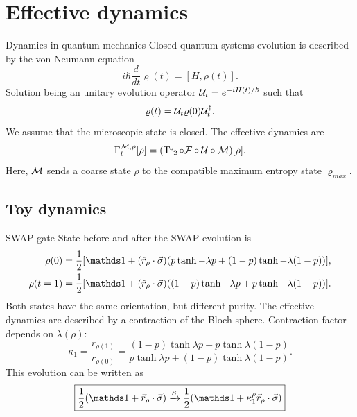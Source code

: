 \section{Effective dynamics}
\begin{frame}{Dynamics in quantum mechanics}
    Closed quantum systems evolution is described by the von Neumann equation
    \begin{equation*}
        i\hbar\frac{d}{d t} \varrho(t)=[H,\rho(t)].
    \end{equation*}
    Solution being an unitary evolution operator $\mathcal{U}_{t}=e^{-iH(t)/\hbar}$ such that
    \begin{equation*}
        \varrho(t)=\mathcal{U}_{t}\varrho(0)\mathcal{U}_{t}^{\dag}.
    \end{equation*}
    We assume that the microscopic state is closed. The effective dynamics are
    \begin{equation*}
        \Gamma_{t}^{\mathcal{M},\rho}[\rho]=(\Tr_{2}\circ\mathcal{F}\circ\mathcal{U}\circ\mathcal{M})[\rho].
    \end{equation*}
        Here, $\mathcal{M}$ sends a coarse state $\rho$ to the compatible maximum entropy state $\varrho_{max}$.
\end{frame}

\subsection{Toy dynamics}

\begin{frame}{SWAP gate}
    State before and after the SWAP evolution is
    \begin{align*}
        \rho(0)&=\frac{1}{2}[\Id+(\hat{r}_{\rho}\cdot\vec{\sigma})(p\tanh{-\lambda p}+(1-p)\tanh{-\lambda (1-p)})],\\
        \rho(t=1)&=\frac{1}{2}[\Id+(\hat{r}_{\rho}\cdot\vec{\sigma})((1-p)\tanh{-\lambda p}+p\tanh{-\lambda (1-p)})].
        \end{align*}
    Both states have the same orientation, but different purity. The effective dynamics are described by a contraction of the Bloch sphere. Contraction factor depends on $\lambda(\rho)$:
    \begin{equation*}
        \kappa_{1}=\frac{r_{\rho(1)}}{r_{\rho(0)}}=\frac{(1-p)\tanh{\lambda p}+p\tanh{\lambda (1-p)}}{
          p\tanh{\lambda p}+(1-p)\tanh{\lambda (1-p)}}.
      \end{equation*}
      This evolution can be written as
      \begin{equation*}
        \boxed{\frac{1}{2}(\Id+\vec{r}_{\rho}\cdot\vec{\sigma}) \xrightarrow{S} \frac{1}{2}(\Id+\kappa_{1}^{\rho}\vec{r}_{\rho}\cdot\vec{\sigma})}
      \end{equation*}
\end{frame}


